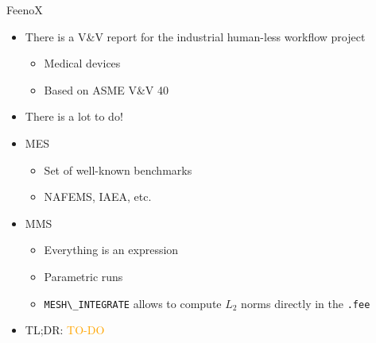 \documentclass[
  ignorenonframetext,
  aspectratio=169,
]{beamer}
\newcommand{\passthrough}[1]{#1}
\providecommand{\tightlist}{%
  \setlength{\itemsep}{0pt}\setlength{\parskip}{0pt}}
\begin{document}
\begin{frame}[fragile]{}
\begin{columns}[T]
\begin{column}{0.5\textwidth}
\begin{exampleblock}{FeenoX}
\protect\hypertarget{feenox-11}{}
\begin{itemize}
\item
  There is a V\&V report for the industrial human-less workflow project

  \begin{itemize}
  \tightlist
  \item
    Medical devices
  \item
    Based on ASME V\&V 40
  \end{itemize}
\item
  There is a lot to do!
\item
  MES

  \begin{itemize}
  \tightlist
  \item
    Set of well-known benchmarks
  \item
    NAFEMS, IAEA, etc.
  \end{itemize}
\item
  MMS

  \begin{itemize}
  \tightlist
  \item
    Everything is an expression
  \item
    Parametric runs
  \item
    \passthrough{\lstinline!MESH\_INTEGRATE!} allows to compute \(L_2\)
    norms directly in the \passthrough{\lstinline!.fee!}
  \end{itemize}
\end{itemize}

\bigskip

\begin{itemize}
\tightlist
\item
  TL;DR: \textcolor{Orange}{TO-DO}
\end{itemize}
\end{exampleblock}
\end{column}
\end{columns}
\end{frame}
\end{document}
